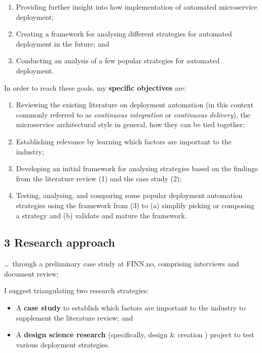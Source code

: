 \begin{enumerate}
\def\labelenumi{\arabic{enumi}.}
\tightlist
\item
  Providing further insight into how implementation of automated
  microservice deployment;
\item
  Creating a framework for analysing different strategies for automated
  deployment in the future; and
\item
  Conducting an analysis of a few popular strategies for automated
  deployment.
\end{enumerate}

In order to reach these goals, my \textbf{specific objectives} are:

\begin{enumerate}
\def\labelenumi{\arabic{enumi}.}
\tightlist
\item
  Reviewing the existing literature on deployment automation (in this
  context commonly referred to as \emph{continuous integration} or
  \emph{continuous delivery}), the microservice architectural style in
  general, how they can be tied together;
\item
  Establishing relevance by learning which factors are important to the
  industry;
\item
  Developing an initial framework for analysing strategies based on the
  findings from the literature review (1) and the case study (2);
\item
  Testing, analysing, and comparing some popular deployment automation
  strategies using the framework from (3) to (a) simplify picking or
  composing a strategy and (b) validate and mature the framework.
\end{enumerate}

\subsection{3 Research approach}\label{research-approach}

\ldots{}~through a preliminary case study at FINN.no, comprising
interviews and document review;

I suggest triangulating two research strategies:

\begin{itemize}
\tightlist
\item
  A \textbf{case study} to establish which factors are important to the
  industry to supplement the literature review; and
\item
  A \textbf{design science research} \autocite{vaishnavi:2015}
  (specifically, design \& creation \autocite{oates:2006}) project to
  test various deployment strategies.
\end{itemize}

